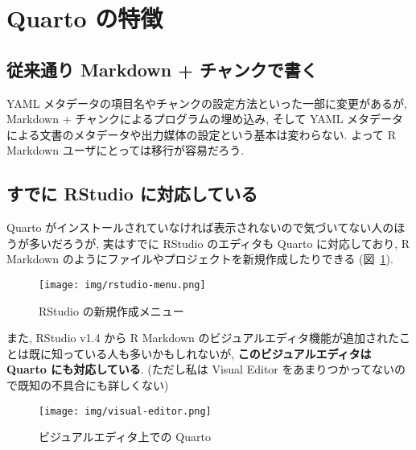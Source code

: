 \documentclass[
  letterpaper,
  DIV=11,
  pandoc,
  ja=standard,
  jafont=noto-otf]{bxjsarticle}
\begin{document}
\hypertarget{quarto-ux306eux7279ux5fb4}{%
\section{Quarto の特徴}\label{quarto-ux306eux7279ux5fb4}}

\hypertarget{ux5f93ux6765ux901aux308a-markdown-ux30c1ux30e3ux30f3ux30afux3067ux66f8ux304f}{%
\subsection{従来通り Markdown +
チャンクで書く}\label{ux5f93ux6765ux901aux308a-markdown-ux30c1ux30e3ux30f3ux30afux3067ux66f8ux304f}}

YAML メタデータの項目名やチャンクの設定方法といった一部に変更があるが,
Markdown + チャンクによるプログラムの埋め込み, そして YAML
メタデータによる文書のメタデータや出力媒体の設定という基本は変わらない.
よって R Markdown ユーザにとっては移行が容易だろう.

\hypertarget{ux3059ux3067ux306b-rstudio-ux306bux5bfeux5fdcux3057ux3066ux3044ux308b}{%
\subsection{すでに RStudio
に対応している}\label{ux3059ux3067ux306b-rstudio-ux306bux5bfeux5fdcux3057ux3066ux3044ux308b}}

Quarto
がインストールされていなければ表示されないので気づいてない人のほうが多いだろうが,
実はすでに RStudio のエディタも Quarto に対応しており, R Markdown
のようにファイルやプロジェクトを新規作成したりできる
(図~\ref{fig-rstudio-menu}).

\begin{figure}

{\centering 

\texttt{[image: img/rstudio-menu.png]}

}

\caption{\label{fig-rstudio-menu}RStudio の新規作成メニュー}

\end{figure}

また, RStudio v1.4 から R Markdown
のビジュアルエディタ機能が追加されたことは既に知っている人も多いかもしれないが,
\textbf{このビジュアルエディタは Quarto にも対応している}. (ただし私は
Visual Editor をあまりつかってないので既知の不具合にも詳しくない)

\begin{figure}

{\centering 

\texttt{[image: img/visual-editor.png]}

}

\caption{\label{fig-visual}ビジュアルエディタ上での Quarto}

\end{figure}
\end{document}
